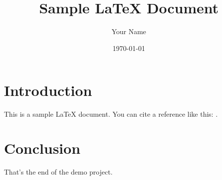 \documentclass{article}
\title{Sample LaTeX Document}
\author{Your Name}
\date{\today}
\begin{document}
    \maketitle

    \section{Introduction}
    This is a sample LaTeX document. You can cite a reference like this: \cite{lamport1994latex}.

    \section{Conclusion}
    That's the end of the demo project.

    \printbibliography
\end{document}
